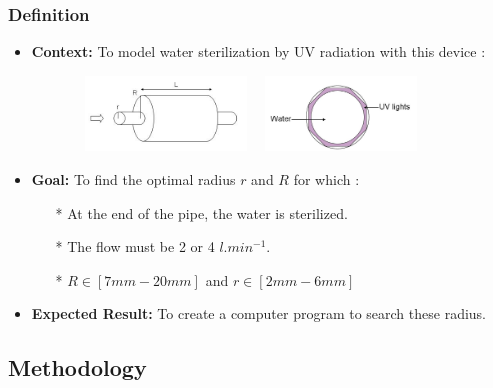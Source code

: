 \documentclass[xcolor=dvipsnames,10pt]{beamer}
\begin{document}
  \begin{frame}
          \frametitle{Definition}
  \begin{itemize}[<+->]
  \item \textbf{Context:} To model water sterilization by UV radiation with this device :
          \begin{figure}
                  \raggedleft
                  \includegraphics[width=5cm,height=2cm]{./images/sterilisateurh.jpg}
                  \hspace{3mm}
                  \raggedright
                  \includegraphics[width=4cm,height=2cm]{./images/coupeSterilisateur.jpg}
          \end{figure}
  \item \textbf{Goal:} To find the optimal radius $r$ and $R$ for which :
          \begin{itemize} 
                  \item[*] At the end of the pipe, the water is sterilized.
                  \item[*] The flow must be 2 or 4 $l.min^{-1}$.
                  \item[*] $R \in [7mm - 20mm]$ and $r \in [2mm - 6mm]$
          \end{itemize}
  \item \textbf{Expected Result:} To create a computer program to search these radius.
  \end{itemize}
  \end{frame}

  \subsection{Methodology}
\end{document}
